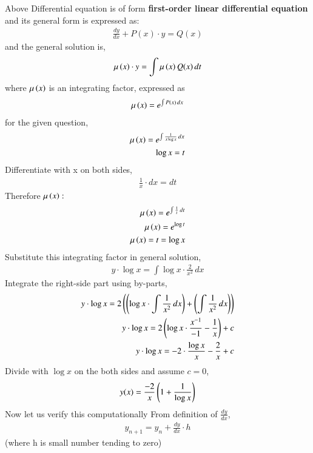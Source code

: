 \documentclass[journal]{IEEEtran}
\begin{document}
Above Differential equation is of form \textbf{first-order linear differential equation} and its general form is expressed as:
\begin{align}
    \frac{dy}{dx} + P(x) \cdot y = Q(x)
\end{align}
and the general solution is,
\begin{align}
    \mu \left(x\right) \cdot y = \int \mu \left(x\right) Q(x) \, dt
\end{align}
where $\mu \left(x\right)$ is an integrating factor, expressed as 
\begin{align}
\mu \left(x\right) = e ^ {\int P(x) \, dx}
\end{align}
for the given question,
\begin{align}
    \mu \left(x\right) = e ^ {\int \frac{1}{x \log x} \, dx} \\
    \log x = t 
\end{align}
Differentiate with x on both sides,
\begin{align}
    \frac{1}{x} \cdot dx = dt
\end{align}
Therefore $\mu \left(x\right):$
\begin{align}
    \mu \left(x\right) = e ^ {\int \frac{1}{t} \, dt}\\
    \mu \left(x\right) = e ^ {\log t}\\
    \mu \left(x\right) = t = \log x
\end{align}
Substitute this integrating factor in general solution,
\begin{align}
    y \cdot \log x = \int \log x \cdot \frac{2}{x^2} \, dx
\end{align}
Integrate the right-side part using by-parts,
\begin{align}
    y \cdot \log x = 2 \left(\left(\log x \cdot \int {\frac{1}{x^2}} \, dx\right) + \left(\int \frac{1}{x^2}\, dx\right)\right)\\
    y \cdot \log x = 2 \left(\log x \cdot \frac{x^{-1}}{-1} - \frac{1}{x}\right) + c\\
    y \cdot \log x = -2 \cdot \frac{\log x}{x} - \frac{2}{x} +c 
\end{align}
Divide with $\log x$ on the both sides and assume $c = 0$,
\begin{align}
    y(x) = \frac{-2}{x} \left(1 + \frac{1}{\log x}\right)
\end{align}
Now let us verify this computationally
From definition of $\frac{dy}{dx}$,
\begin{align}
    y_{n+1}=y_{n}+\frac{dy}{dx}\cdot h
    \label{0.15}
\end{align}
(where h is small number tending to zero)
\end{document}

